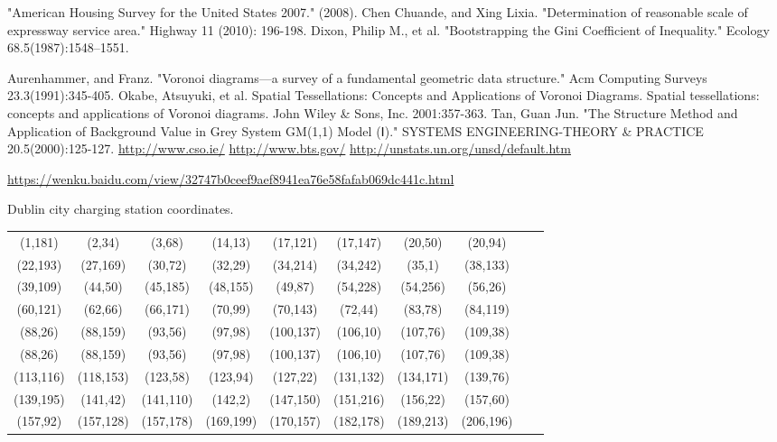 \documentclass{mcmthesis}
\begin{document}
\newpage
\begin{thebibliography}{99}
 "American Housing Survey for the United States 2007." (2008).
 Chen Chuande, and Xing Lixia. "Determination of reasonable scale of expressway service area." Highway 11 (2010): 196-198.
 Dixon, Philip M., et al. "Bootstrapping the Gini Coefficient of Inequality." Ecology 68.5(1987):1548–1551.

 Aurenhammer, and Franz. "Voronoi diagrams—a survey of a fundamental geometric data structure." Acm Computing Surveys 23.3(1991):345-405.
 Okabe, Atsuyuki, et al. Spatial Tessellations: Concepts and Applications of Voronoi Diagrams. Spatial tessellations: concepts and applications of Voronoi diagrams. John Wiley \& Sons, Inc. 2001:357-363.
 Tan, Guan Jun. "The Structure Method and Application of Background Value in Grey System GM(1,1) Model (Ⅰ)." SYSTEMS ENGINEERING-THEORY \& PRACTICE 20.5(2000):125-127.
 \url{http://www.cso.ie/}
 \url{http://www.bts.gov/}
 \url{http://unstats.un.org/unsd/default.htm} 

 \url{https://wenku.baidu.com/view/32747b0ceef9aef8941ea76e58fafab069dc441c.html}


\end{thebibliography}

\newpage
\begin{appendices}
\par Dublin city charging station coordinates.


\begin{table}[h]
\centering
\begin{tabular}{cccccccccc}
\toprule
(1,181)&(2,34)&(3,68)&(14,13)&(17,121)&(17,147)&(20,50)&
(20,94)\\
(22,193)&(27,169)&(30,72)&(32,29)&(34,214)&(34,242)&(35,1)&(38,133)\\
(39,109)&(44,50)&(45,185)&
(48,155)&(49,87)&(54,228)&(54,256)&(56,26)\\
(60,121)&
(62,66)&(66,171)&(70,99)&(70,143)&(72,44)&(83,78)&
(84,119)\\
(88,26)&(88,159)&(93,56)&(97,98)&(100,137)&
(106,10)&(107,76)&(109,38)\\
(88,26)&(88,159)&(93,56)&(97,98)&(100,137)&
(106,10)&(107,76)&(109,38)\\
(113,116)&(118,153)&(123,58)&
(123,94)&(127,22)&(131,132)&(134,171)&(139,76)\\
(139,195)&
(141,42)&(141,110)&(142,2)&(147,150)&(151,216)&(156,22)&
(157,60)\\
(157,92)&(157,128)&(157,178)&(169,199)&
(170,157)&(182,178)&(189,213)&(206,196)\\

\bottomrule
\end{tabular}
\end{table}







\end{appendices}
\end{document}
